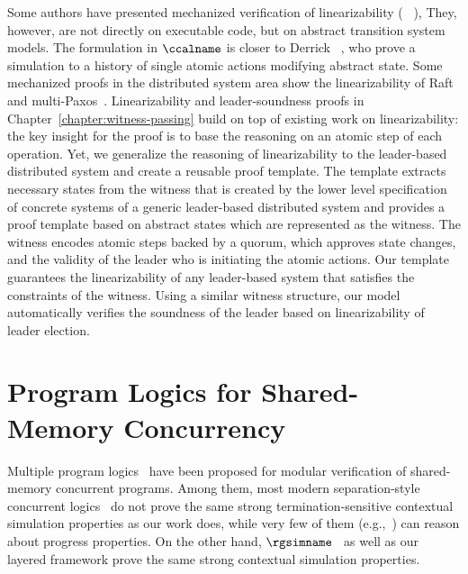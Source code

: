 Some
authors have presented mechanized verification of linearizability
(\eg~ \cite{DGLMQueue,DerrickSW11}),
They, however, are not directly on executable
code, but on abstract transition system models.
The formulation in $\ccalname$  is closer to Derrick \etal~\cite{DerrickSW11}, who prove a simulation
to a history of single atomic actions modifying abstract state.  
Some mechanized proofs in the distributed system area show 
the linearizability of Raft and
multi-Paxos~\cite{cppraft, ironfleet}.
%
Linearizability
and leader-soundness proofs in Chapter~\ref{chapter:witness-passing} build on top of existing work on
linearizability: the key insight for the proof is to base the reasoning on
an atomic step of each operation.  Yet, we generalize the reasoning of linearizability
to the leader-based distributed system and create a reusable proof template.
The template extracts
necessary states from the witness that is created by the lower level
specification of concrete systems
of a generic leader-based distributed system and provides a proof template based on
abstract states which are represented as the witness.
The witness encodes atomic steps backed by a quorum, which approves state
changes, and the validity of the leader who is initiating the atomic actions.
Our template guarantees the linearizability of any leader-based system that
satisfies the constraints of the witness. Using a similar witness structure, our
model automatically verifies the soundness of the leader based on
linearizability of leader election.




\section{Program Logics for Shared-Memory Concurrency}
\label{chatper:related:sec:program-logics-for-shared-memory-concurrency}

Multiple program  logics~
\cite{cap10, ohearn:concur04,brookes:concur04,feng07:sagl,vafeiadis:marriage,LRG,verifast,gotsman13,Turon13popl,Turon13icfp,nanevski13,nanevski14,
sergey15,sergey15pldi,pinto14,iris15,civl15,pinto16,xu16}
have been proposed for 
modular verification of shared-memory concurrent programs. 
Among them, most modern separation-style concurrent logics~
\cite{cap10,Turon13popl,sergey15pldi,pinto14,iris15,pinto16} do
not prove the same strong termination-sensitive contextual simulation
properties as our work does,
while very few of them (e.g.,~\cite{pinto16})
can reason about progress properties.
On the other hand,
$\rgsimname$~\cite{RGSim} as well as our layered framework prove the same strong contextual simulation properties.

